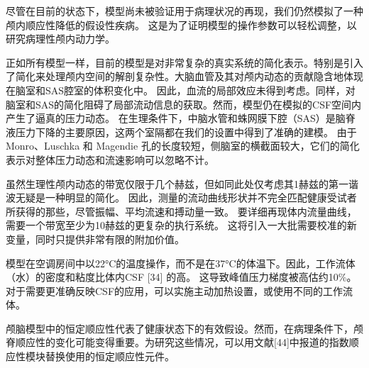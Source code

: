 \documentclass[12pt]{article}
\begin{document}
尽管在目前的状态下，模型尚未被验证用于病理状况的再现，我们仍然模拟了一种颅内顺应性降低的假设性疾病。
这是为了证明模型的操作参数可以轻松调整，以研究病理性颅内动力学。

正如所有模型一样，目前的模型是对非常复杂的真实系统的简化表示。特别是引入了简化来处理颅内空间的解剖复杂性。大脑血管及其对颅内动态的贡献隐含地体现在脑室和SAS腔室的体积变化中。
因此，血流的局部效应未得到考虑。同样，对脑室和SAS的简化阻碍了局部流动信息的获取。然而，模型仍在模拟的CSF空间内产生了逼真的压力动态。
在生理条件下，中脑水管和蛛网膜下腔（SAS）是脑脊液压力下降的主要原因，这两个室隔都在我们的设置中得到了准确的建模。
由于 Monro、Luschka 和 Magendie 孔的长度较短，侧脑室的横截面较大，它们的简化表示对整体压力动态和流速影响可以忽略不计。

虽然生理性颅内动态的带宽仅限于几个赫兹，但如同此处仅考虑其1赫兹的第一谐波无疑是一种明显的简化。
因此，测量的流动曲线形状并不完全匹配健康受试者所获得的那些，尽管振幅、平均流速和搏动量一致。
要详细再现体内流量曲线，需要一个带宽至少为10赫兹的更复杂的执行系统。
这将引入一大批需要校准的新变量，同时只提供非常有限的附加价值。

模型在空调房间中以22°C的温度操作，而不是在37°C的体温下。因此，工作流体（水）的密度和粘度比体内CSF [34] 的高。
这导致峰值压力梯度被高估约10\%。对于需要更准确反映CSF的应用，可以实施主动加热设置，或使用不同的工作流体。

颅脑模型中的恒定顺应性代表了健康状态下的有效假设。然而，在病理条件下，颅脊顺应性的变化可能变得重要。为研究这些情况，可以用文献[44]中报道的指数顺应性模块替换使用的恒定顺应性元件。
\end{document}
